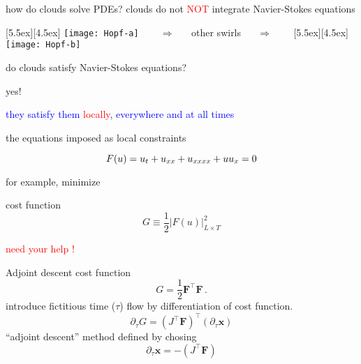 \begin{frame}{how do clouds solve PDEs?}
clouds do not \textcolor{red}{\Huge NOT} {integrate} Navier-Stokes equations

\bigskip\bigskip

\begin{center}
\begin{minipage}[t]{\textwidth}
	\begin{center}
\centerline{
\raisebox{-4.0ex}[5.5ex][4.5ex]
		 {\texttt{[image: Hopf-a]}}
~~~ $\Longrightarrow$ ~~ {other swirls} ~~ $\Longrightarrow$ ~~~
	\raisebox{-4.0ex}[5.5ex][4.5ex]
		 {\texttt{[image: Hopf-b]}}
          }
	\end{center}
\end{minipage}
\end{center}

do clouds satisfy Navier-Stokes equations?

\bigskip

{\Large yes!}

\centerline{
\textcolor{blue}{they satisfy them \textcolor{red}{\large locally}, everywhere and at all times}
}
\end{frame}

\begin{frame}{the equations imposed as local constraints}
\begin{block}{\KSe}
\[
F(u) = u_t + u_{x x} + u_{x x x x} + u u_{x} = 0
\]
\end{block}
\bigskip\bigskip
for example, minimize
\begin{block}{cost function}
\[
G \equiv \frac{1}{2} |F(u)|^2_{L \times T}
\]
\end{block}
\vfill\hfill\textcolor{red}{\Huge need your help !}
\end{frame}

\begin{frame}{Adjoint descent}
cost function
\[
  G = \frac{1}{2} \mathbf{F}^{\top}\mathbf{F}
  \,.
\]
introduce fictitious time ($\tau$) flow by differentiation of cost function.
\[
  \partial_{\tau}G = (J^{\top}\mathbf{F})^{\top}(\partial_{\tau}\mathbf{x})
\]
  ``adjoint descent'' method defined by chosing
\[
  \partial_{\tau}\mathbf{x} = -(J^{\top}\mathbf{F})
\]

\end{frame}

